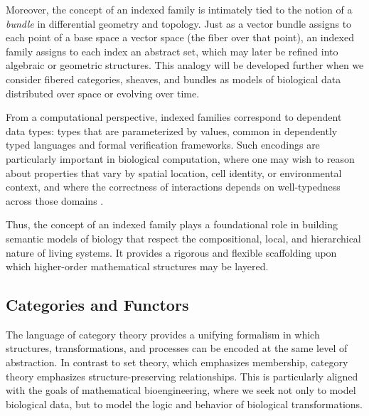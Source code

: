 Moreover, the concept of an indexed family is intimately tied to the notion of a \emph{bundle} in differential geometry and topology. Just as a vector bundle assigns to each point of a base space a vector space (the fiber over that point), an indexed family assigns to each index an abstract set, which may later be refined into algebraic or geometric structures. This analogy will be developed further when we consider fibered categories, sheaves, and bundles as models of biological data distributed over space or evolving over time.

From a computational perspective, indexed families correspond to dependent data types: types that are parameterized by values, common in dependently typed languages and formal verification frameworks. Such encodings are particularly important in biological computation, where one may wish to reason about properties that vary by spatial location, cell identity, or environmental context, and where the correctness of interactions depends on well-typedness across those domains \cite{pierce_types_2002}.

Thus, the concept of an indexed family plays a foundational role in building semantic models of biology that respect the compositional, local, and hierarchical nature of living systems. It provides a rigorous and flexible scaffolding upon which higher-order mathematical structures may be layered.

\subsection{Categories and Functors}

The language of category theory provides a unifying formalism in which structures, transformations, and processes can be encoded at the same level of abstraction. In contrast to set theory, which emphasizes membership, category theory emphasizes structure-preserving relationships. This is particularly aligned with the goals of mathematical bioengineering, where we seek not only to model biological data, but to model the logic and behavior of biological transformations.

